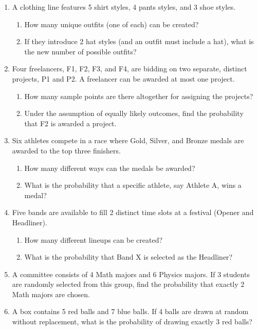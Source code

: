 \documentclass[11pt]{article}
\begin{document}
\begin{enumerate}
\item A clothing line features 5 shirt styles, 4 pants styles, and 3 shoe styles.
\begin{enumerate}
    \item How many unique outfits (one of each) can be created?
    \item If they introduce 2 hat styles (and an outfit must include a hat), what is the new number of possible outfits?
\end{enumerate}

\item Four freelancers, F1, F2, F3, and F4, are bidding on two separate, distinct projects, P1 and P2. A freelancer can be awarded at most one project.
\begin{enumerate}
    \item How many sample points are there altogether for assigning the projects?
    \item Under the assumption of equally likely outcomes, find the probability that F2 is awarded a project.
\end{enumerate}

\item Six athletes compete in a race where Gold, Silver, and Bronze medals are awarded to the top three finishers. 
\begin{enumerate}
    \item How many different ways can the medals be awarded?
    \item What is the probability that a specific athlete, say Athlete A, wins a medal?
\end{enumerate}

\item Five bands are available to fill 2 distinct time slots at a festival (Opener and Headliner). 
\begin{enumerate}
    \item How many different lineups can be created?
    \item What is the probability that Band X is selected as the Headliner?
\end{enumerate}

\item A committee consists of 4 Math majors and 6 Physics majors. If 3 students are randomly selected from this group, find the probability that exactly 2 Math majors are chosen.

\item A box contains 5 red balls and 7 blue balls. If 4 balls are drawn at random without replacement, what is the probability of drawing exactly 3 red balls?


\end{enumerate}
\end{document}
